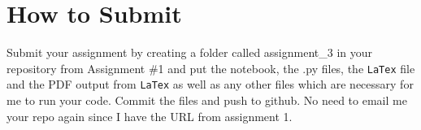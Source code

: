 \documentclass{article}
\begin{document}
\section*{How to Submit}

Submit your assignment by creating a folder called assignment\_3 in your repository from Assignment \#1 and put the notebook, the .py files, the \texttt{LaTex} file and the PDF output from \texttt{LaTex} as well as any other files which are necessary for me to run your code. Commit the files and push to github. No need to email me your repo again since I have the URL from assignment 1.
\end{document}
